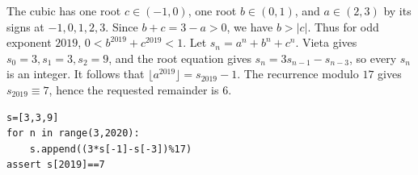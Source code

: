 The cubic has one root $c\in(-1,0)$, one root $b\in(0,1)$, and $a\in(2,3)$ by its signs at $-1,0,1,2,3$. Since $b+c=3-a>0$, we have $b>|c|$. Thus for odd exponent $2019$, $0<b^{2019}+c^{2019}<1$. Let $s_n=a^n+b^n+c^n$. Vieta gives $s_0=3,s_1=3,s_2=9$, and the root equation gives $s_n=3s_{n-1}-s_{n-3}$, so every $s_n$ is an integer. It follows that $\lfloor a^{2019}\rfloor=s_{2019}-1$. The recurrence modulo $17$ gives $s_{2019}\equiv7$, hence the requested remainder is $\boxed6$.\begin{verbatim}
s=[3,3,9]
for n in range(3,2020):
    s.append((3*s[-1]-s[-3])%17)
assert s[2019]==7
\end{verbatim}
